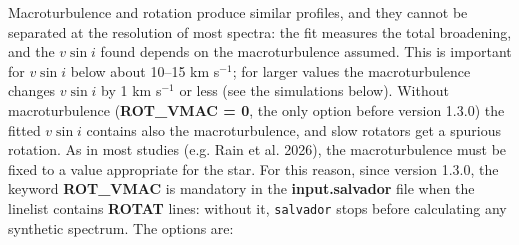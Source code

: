 \documentclass[modern]{aastex701}
\begin{document}
Macroturbulence and rotation produce similar profiles, and they cannot be separated at the resolution of most spectra: the fit measures the total broadening, and the $v \sin i$ found depends on the macroturbulence assumed. This is important for $v \sin i$ below about 10--15 km s$^{-1}$; for larger values the macroturbulence changes $v \sin i$ by 1 km s$^{-1}$ or less (see the simulations below). Without macroturbulence ({\bf ROT\_VMAC = 0}, the only option before version 1.3.0) the fitted $v \sin i$ contains also the macroturbulence, and slow rotators get a spurious rotation. As in most studies (e.g. Rain et al. 2026), the macroturbulence must be fixed to a value appropriate for the star. For this reason, since version 1.3.0, the keyword {\bf ROT\_VMAC} is mandatory in the {\bf input.salvador} file when the linelist contains {\bf ROTAT} lines: without it, \texttt{salvador} stops before calculating any synthetic spectrum. The options are:
\end{document}

